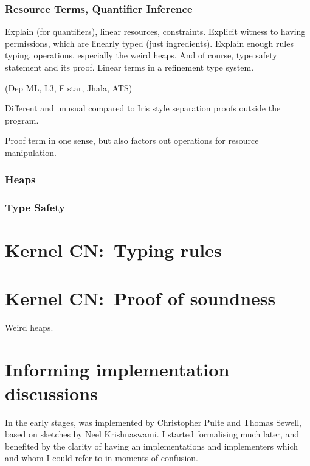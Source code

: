 \subsection{Resource Terms, Quantifier Inference}\label{subsec:resq-inf}

Explain  (for quantifiers), linear resources, constraints.
Explicit witness to having permissions, which are linearly typed (just ingredients).
Explain enough rules \textemdash{} typing, operations, especially the weird heaps.
And of course, type safety statement and its proof.
Linear terms in a refinement type system.

(Dep ML, L3, F star, Jhala, ATS)

Different and unusual compared to Iris style \textemdash{} separation proofs outside the program.

Proof term in one sense, but also factors out operations for resource manipulation.

\subsection{Heaps}


\subsection{Type Safety}

\chapter{Kernel CN:\ Typing rules}%

\chapter{Kernel CN:\ Proof of soundness}%
\label{chap:kernel-soundness}

Weird heaps.

\chapter{Informing implementation discussions}%

In the early stages,  was implemented by Christopher Pulte and Thomas
Sewell, based on sketches by Neel Krishnaswami. I started formalising
 much later, and benefited by the clarity of having an
implementations and implementers which and whom I could refer to in moments of
confusion.

